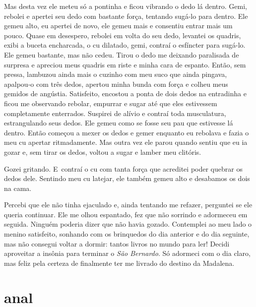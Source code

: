 Mas desta vez ele meteu só a pontinha e ficou vibrando o dedo lá dentro.
Gemi, rebolei e apertei seu dedo com bastante força, tentando sugá-lo
para dentro. Ele gemeu alto, eu apertei de novo, ele gemeu mais e
consentiu entrar mais um pouco. Quase em desespero, rebolei em volta do
seu dedo, levantei os quadris, exibi a buceta encharcada, o cu dilatado,
gemi, contraí o esfíncter para sugá-lo. Ele gemeu bastante, mas não
cedeu. Tirou o dedo me deixando paralisada de surpresa e apreciou meus
quadris em riste e minha cara de espanto. Então, sem pressa, lambuzou
ainda mais o cuzinho com meu suco que ainda pingava, apalpou-o com três
dedos, apertou minha bunda com força e colheu meus gemidos de angústia.
Satisfeito, encostou a ponta de dois dedos na entradinha e ficou me
observando rebolar, empurrar e sugar até que eles estivessem
completamente enterrados. Suspirei de alívio e contraí toda musculatura,
estrangulando seus dedos. Ele gemeu como se fosse seu pau que estivesse
lá dentro. Então começou a mexer os dedos e gemer enquanto eu rebolava e
fazia o meu cu apertar ritmadamente. Mas outra vez ele parou quando
sentiu que eu ia gozar e, sem tirar os dedos, voltou a sugar e lamber
meu clitóris.

Gozei gritando. E~contraí o cu com tanta força que acreditei poder
quebrar os dedos dele. Sentindo meu cu latejar, ele também gemeu alto e
desabamos os dois na cama.

Percebi que ele não tinha ejaculado e, ainda tentando me refazer,
perguntei se ele queria continuar. Ele me olhou espantado, fez que não
sorrindo e adormeceu em seguida. Ninguém poderia dizer que não havia
gozado. Contemplei ao meu lado o menino satisfeito, sonhando com os
brinquedos do dia anterior e do dia seguinte, mas não consegui voltar a
dormir: tantos livros no mundo para ler! Decidi aproveitar a insônia
para terminar o \emph{São Bernardo}. Só adormeci com o dia claro, mas
feliz pela certeza de finalmente ter me livrado do destino da Madalena.

\chapter{ anal}

